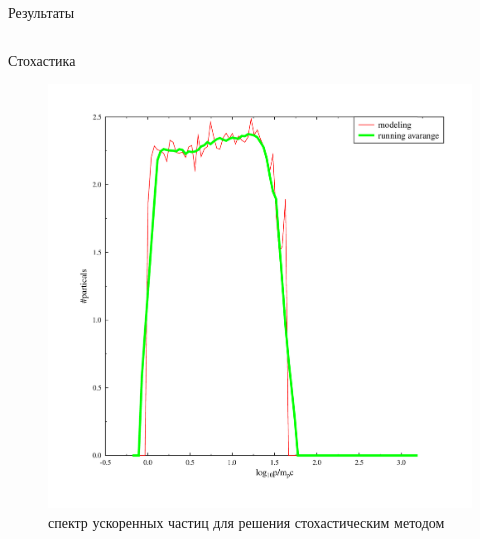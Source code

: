 \documentclass[8pt,pdf,hyperref={unicode},serif]{beamer}
\begin{document}
\begin{frame}{Результаты}
\begin{columns}
\begin{column}{0.5\textwidth}
Стохастика
\begin{figure}[H]
\centering
\includegraphics[width=0.90\linewidth]{stoh_bom_one}
\caption{спектр ускоренных частиц для решения стохастическим методом}
\end{figure}
\end{column}
\end{columns}
\end{frame}
\end{document}

